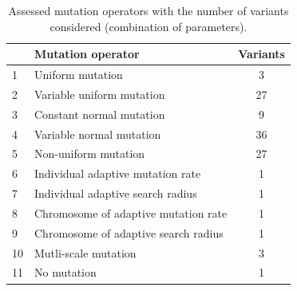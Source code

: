 \documentclass{ametsoc}
\begin{document}
\begin{table}[t]
	\caption{Assessed mutation operators with the number of variants considered (combination of parameters).}
	\begin{center}
		\begin{tabular}{llc}
			\hline\hline  & \textbf{Mutation operator} & \textbf{Variants}\\ 
			\hline 
			1 & Uniform mutation & 3 \\
			2 & Variable uniform mutation & 27 \\
			3 & Constant normal mutation & 9 \\
			4 & Variable normal mutation & 36 \\
			5 & Non-uniform mutation & 27 \\
			6 & Individual adaptive mutation rate & 1 \\
			7 & Individual adaptive search radius & 1 \\
			8 & Chromosome of adaptive mutation rate & 1 \\
			9 & Chromosome of adaptive search radius & 1 \\
			10 & Mutli-scale mutation & 3 \\
			11 & No mutation & 1 \\
			\hline
		\end{tabular}
	\end{center}
	\label{tab:assessed_mutation_operators}
\end{table}
\end{document}
